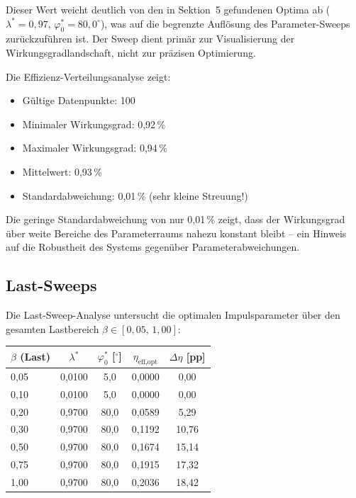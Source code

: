 ﻿\documentclass[a4paper,12pt]{article}
\begin{document}
Dieser Wert weicht deutlich von den in Sektion~5 gefundenen Optima ab
($\lambda^* = 0{,}97$, $\varphi_0^* = 80{,}0^\circ$), was auf die begrenzte
Auflösung des Parameter-Sweeps zurückzuführen ist. Der Sweep dient primär
zur Visualisierung der Wirkungsgradlandschaft, nicht zur präzisen Optimierung.

Die Effizienz-Verteilungsanalyse zeigt:

\begin{itemize}
  \item Gültige Datenpunkte: 100
  \item Minimaler Wirkungsgrad: 0{,}92\,\%
  \item Maximaler Wirkungsgrad: 0{,}94\,\%
  \item Mittelwert: 0{,}93\,\%
  \item Standardabweichung: 0{,}01\,\% (sehr kleine Streuung!)
\end{itemize}

Die geringe Standardabweichung von nur 0{,}01\,\% zeigt, dass der Wirkungsgrad
über weite Bereiche des Parameterraums nahezu konstant bleibt -- ein Hinweis
auf die Robustheit des Systems gegenüber Parameterabweichungen.

\subsection{Last-Sweeps}

Die Last-Sweep-Analyse untersucht die optimalen Impulsparameter über den
gesamten Lastbereich $\beta \in [0{,}05,\, 1{,}00]$:

\begin{center}
\begin{tabular}{lcccc}
\toprule
$\beta$ (Last) & $\lambda^*$ & $\varphi_0^*$ [$^\circ$] & $\eta_\text{eff,opt}$ & $\Delta\eta$ [pp] \\
\midrule
0{,}05 & 0{,}0100 & 5{,}0 & 0{,}0000 & 0{,}00 \\
0{,}10 & 0{,}0100 & 5{,}0 & 0{,}0000 & 0{,}00 \\
0{,}20 & 0{,}9700 & 80{,}0 & 0{,}0589 & 5{,}29 \\
0{,}30 & 0{,}9700 & 80{,}0 & 0{,}1192 & 10{,}76 \\
0{,}50 & 0{,}9700 & 80{,}0 & 0{,}1674 & 15{,}14 \\
0{,}75 & 0{,}9700 & 80{,}0 & 0{,}1915 & 17{,}32 \\
1{,}00 & 0{,}9700 & 80{,}0 & 0{,}2036 & 18{,}42 \\
\bottomrule
\end{tabular}
\end{center}
\end{document}
